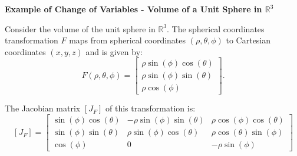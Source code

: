 \documentclass{article}
\newcommand{\R}{\mathbb{R}}
\newenvironment{definition}[1]{
    \par\noindent\textbf{#1}\par\noindent
}{
    \par \vspace{0.5cm}
}
\begin{document}
\begin{definition}{Example of Change of Variables - Volume of a Unit Sphere in \(\R^3\)}
Consider the volume of the unit sphere in \(\R^3\). The spherical coordinates transformation \( F \) maps from spherical coordinates \((\rho, \theta, \phi)\) to Cartesian coordinates \((x, y, z)\) and is given by:
\[
F(\rho, \theta, \phi) = 
\begin{bmatrix}
    \rho \sin(\phi) \cos(\theta) \\
    \rho \sin(\phi) \sin(\theta) \\
    \rho \cos(\phi)
\end{bmatrix}.
\]

The Jacobian matrix \( [J_F] \) of this transformation is:
\[
[J_F] = 
\begin{bmatrix}
    \sin(\phi)\cos(\theta) & -\rho\sin(\phi)\sin(\theta) & \rho\cos(\phi)\cos(\theta) \\
    \sin(\phi)\sin(\theta) & \rho\sin(\phi)\cos(\theta) & \rho\cos(\theta)\sin(\phi) \\
    \cos(\phi) & 0 & -\rho\sin(\phi)
\end{bmatrix}
\]



\end{definition}
\end{document}
